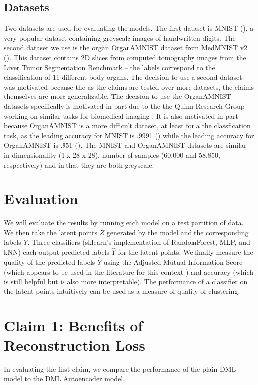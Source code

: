 \documentclass[./dissertation.tex]{subfiles}
\begin{document}
    \subsection{Datasets}
    Two datasets are used for evaluating the models. The first dataset is MNIST (\cite{lecun-mnisthandwrittendigit-2010}), a very popular dataset containing greyscale images of handwritten digits. The second dataset we use is the organ OrganAMNIST dataset from MedMNIST v2 (\cite{medmnistv2}). This dataset contains 2D slices from computed tomography images from the Liver Tumor Segmentation Benchmark -- the labels correspond to the classification of 11 different body organs. The decision to use a second dataset was motivated because the as the claims are tested over more datasets, the claims themselves are more generalizable. The decision to use the OrganAMNIST datasets specifically is motivated in part due to the the Quinn Research Group working on similar tasks for biomedical imaging \cite{Zain2020TowardsAU}. It is also motivated in part because OrganAMNIST is a more difficult dataset, at least for a the classfication task, as the leading accuracy for MNIST is .9991 (\cite{DBLP:journals/corr/abs-2008-10400}) while the leading accuracy for OrganAMNIST is .951 (\cite{medmnistv2}). The MNIST and OrganAMNIST datasets are similar in dimensionality (1 x 28 x 28), number of samples (60,000 and 58,850, respectively) and in that they are both greyscale.
    
    \section{Evaluation}
    We will evaluate the results by running each model on a test partition of data. We then take the latent points $Z$ generated by the model and the corresponding labels $Y$. Three classifiers (sklearn's implementation of RandomForest, MLP, and kNN) each output predicted labels $\hat{Y}$ for the latent points. We finally measure the quality of the predicted labels $\hat{Y}$ using the Adjusted Mutual Information Score \cite{vinh2010information} (which appears to be used in the literature for this context \cite{zhu2021finding} \cite{emmons2016analysis}) and accuracy (which is still helpful but is also more interpretable). The performance of a classifier on the latent points intuitively can be used as a measure of quality of clustering.
    \section{Claim 1: Benefits of Reconstruction Loss}
    In evaluating the first claim, we compare the performance of the plain DML model to the DML Autoencoder model. 
\end{document}
